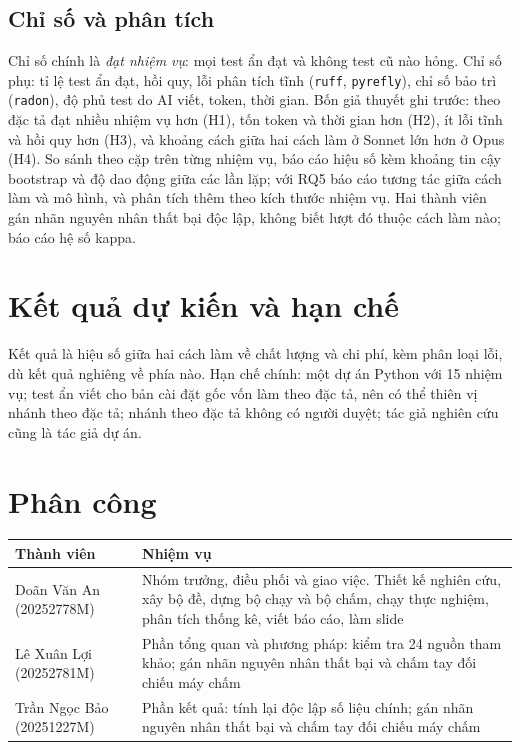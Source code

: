 \documentclass[11pt,a4paper]{article}
\begin{document}
\subsection{Chỉ số và phân tích}
Chỉ số chính là \emph{đạt nhiệm vụ}: mọi test ẩn đạt và không test cũ nào hỏng. Chỉ số phụ: tỉ lệ test
ẩn đạt, hồi quy, lỗi phân tích tĩnh (\texttt{ruff}, \texttt{pyrefly}), chỉ số bảo trì (\texttt{radon}),
độ phủ test do AI viết, token, thời gian. Bốn giả thuyết ghi trước: theo đặc tả đạt nhiều nhiệm vụ hơn
(H1), tốn token và thời gian hơn (H2), ít lỗi tĩnh và hồi quy hơn (H3), và khoảng
cách giữa hai cách làm ở Sonnet lớn hơn ở Opus (H4). So sánh theo cặp trên từng
nhiệm vụ, báo cáo hiệu số kèm khoảng tin cậy bootstrap và độ dao động giữa các lần lặp; với RQ5 báo cáo
tương tác giữa cách làm và mô hình, và phân tích thêm theo kích thước nhiệm vụ. Hai thành viên
gán nhãn nguyên nhân thất bại độc lập, không biết lượt đó thuộc cách làm nào; báo cáo hệ số kappa.

\section{Kết quả dự kiến và hạn chế}
Kết quả là hiệu số giữa hai cách làm về chất lượng và chi phí, kèm phân loại lỗi, dù kết quả nghiêng về
phía nào. Hạn chế chính: một dự án Python với 15 nhiệm vụ; test ẩn viết cho bản cài đặt gốc vốn làm
theo đặc tả, nên có thể thiên vị nhánh theo đặc tả; nhánh theo đặc tả không có người duyệt; tác giả
nghiên cứu cũng là tác giả dự án.

\section{Phân công}
\begin{center}\small
\begin{tabularx}{\linewidth}{@{}lX@{}}
\toprule
Thành viên & Nhiệm vụ \\
\midrule
Doãn Văn An (20252778M) & Nhóm trưởng, điều phối và giao việc. Thiết kế nghiên cứu, xây bộ đề, dựng bộ chạy và bộ chấm, chạy thực nghiệm, phân tích thống kê, viết báo cáo, làm slide \\
Lê Xuân Lợi (20252781M) & Phần tổng quan và phương pháp: kiểm tra 24 nguồn tham khảo; gán nhãn nguyên nhân thất bại và chấm tay đối chiếu máy chấm \\
Trần Ngọc Bảo (20251227M) & Phần kết quả: tính lại độc lập số liệu chính; gán nhãn nguyên nhân thất bại và chấm tay đối chiếu máy chấm \\
\bottomrule
\end{tabularx}
\end{center}

{\small
\renewcommand{\refname}{Tài liệu tham khảo}


}
\end{document}
